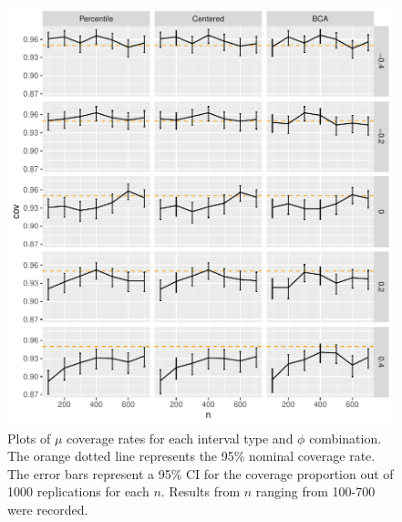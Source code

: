 \documentclass[12pt, letterpaper, titlepage]{article}
\begin{document}
\begin{figure}[tbp]
  \centering
  \includegraphics[width=\textwidth]{figures/plot_mu}
  \caption{Plots of $\mu$ coverage rates for each interval type and $\phi$
    combination. The orange dotted line represents the 95\% nominal coverage
    rate. The error bars represent a 95\% CI for the coverage
    proportion out of 1000 replications for each $n$. Results from $n$
    ranging from 100-700 were recorded.}
  \label{fig:mu}
\end{figure}
\end{document}
